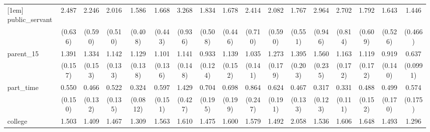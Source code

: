 {\begin{tabular}{l*{16}{c}}
[1em]
public\_servant      &       2.487\sym{***}&       2.246\sym{**} &       2.016\sym{**} &       1.586         &       1.668         &       3.268\sym{***}&       1.834\sym{*}  &       1.678         &       2.414\sym{**} &       2.082\sym{**} &       1.767         &       2.964\sym{***}&       2.702\sym{***}&       1.792         &       1.643         &       1.446         \\
                    &     (0.636)         &     (0.590)         &     (0.510)         &     (0.408)         &     (0.443)         &     (0.936)         &     (0.508)         &     (0.446)         &     (0.710)         &     (0.590)         &     (0.551)         &     (0.946)         &     (0.814)         &     (0.609)         &     (0.526)         &     (0.466)         \\
[1em]
parent\_15           &       1.391\sym{**} &       1.334\sym{*}  &       1.142         &       1.129         &       1.101         &       1.141         &       0.933         &       1.139         &       1.035         &       1.273         &       1.395\sym{*}  &       1.560\sym{**} &       1.163         &       1.119         &       0.919         &       0.637\sym{**} \\
                    &     (0.157)         &     (0.153)         &     (0.133)         &     (0.138)         &     (0.136)         &     (0.148)         &     (0.124)         &     (0.152)         &     (0.141)         &     (0.179)         &     (0.203)         &     (0.235)         &     (0.172)         &     (0.172)         &     (0.140)         &    (0.0991)         \\
[1em]
part\_time           &       0.550\sym{*}  &       0.466\sym{**} &       0.522\sym{*}  &       0.324\sym{***}&       0.597\sym{*}  &       1.429         &       0.704         &       0.698         &       0.864         &       0.624         &       0.467\sym{**} &       0.317\sym{**} &       0.331\sym{**} &       0.488\sym{*}  &       0.499\sym{*}  &       0.574         \\
                    &     (0.150)         &     (0.132)         &     (0.135)         &    (0.0812)         &     (0.151)         &     (0.427)         &     (0.195)         &     (0.199)         &     (0.247)         &     (0.191)         &     (0.133)         &     (0.123)         &     (0.111)         &     (0.152)         &     (0.170)         &     (0.175)         \\
[1em]
college             &       1.503\sym{**} &       1.409\sym{*}  &       1.467\sym{**} &       1.309\sym{*}  &       1.563\sym{**} &       1.610\sym{**} &       1.475\sym{**} &       1.600\sym{**} &       1.579\sym{**} &       1.492\sym{*}  &       2.058\sym{***}&       1.536\sym{*}  &       1.606\sym{**} &       1.648\sym{**} &       1.493\sym{*}  &       1.296         \\

\end{tabular}}

